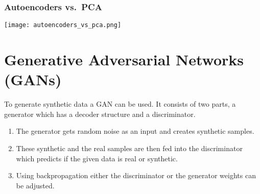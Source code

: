 \subsubsection{Autoencoders vs.\ PCA}
\begin{center}
    \texttt{[image: autoencoders\_vs\_pca.png]}
\end{center}

\section{Generative Adversarial Networks (GANs)}

To generate synthetic data a GAN can be used. It consists of two parts, a generator which has a decoder structure and a discriminator. 
\begin{enumerate}
    \item The generator gets random noise as an input and creates synthetic samples.
    \item These synthetic and the real samples are then fed into the discriminator which predicts if the given data is real or synthetic.
    \item Using backpropagation either the discriminator or the generator weights can be adjusted.
\end{enumerate}
